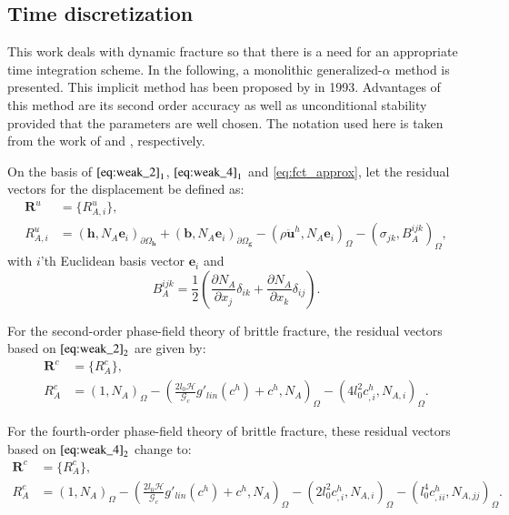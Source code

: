 \subsection{Time discretization} \label{sec:time_discr}
This work deals with dynamic fracture so that there is a need for an appropriate time integration scheme. In the following, a monolithic generalized-$\alpha$ method is presented. This implicit method has been proposed by \citet{10_PF_genAlpha} in 1993. Advantages of this method are its second order accuracy as well as unconditional stability provided that the parameters are well chosen. The notation used here is taken from the work of \citet{02_PF_HO_brittle} and \citet{01_PF_dyn_brittle}, respectively.

On the basis of $\eqref{eq:weak_2}_{1}$, $\eqref{eq:weak_4}_{1}$ and \eqref{eq:fct_approx}, let the residual vectors for the displacement be defined as:
\begin{equation} \label{eq:res_vecs_u}
	\begin{aligned}
		\mathbf{R}^{u}&=\{R_{A,i}^{u}\}, \\
		R_{A,i}^{u} &= \left(\mathbf{h},N_{A}\mathbf{e}_{i}\right)_{\partial\Omega_{\mathbf{h}}} + \left(\mathbf{b},N_{A}\mathbf{e}_{i}\right)_{\partial\Omega_{\mathbf{g}}} - \left(\rho\ddot{\mathbf{u}}^{h},N_{A}\mathbf{e}_{i}\right)_{\Omega}-\left(\sigma_{jk},B_{A}^{ijk}\right)_{\Omega},
	\end{aligned}
\end{equation}
with $i$'th Euclidean basis vector $\mathbf{e}_{i}$ and
\begin{equation}
	B_{A}^{ijk}=\frac{1}{2}\left(\frac{\partial N_{A}}{\partial x_{j}}\delta_{ik}+\frac{\partial N_{A}}{\partial x_{k}}\delta_{ij}\right).
\end{equation}

For the second-order phase-field theory of brittle fracture, the residual vectors based on $\eqref{eq:weak_2}_{2}$ are given by:
\begin{equation} \label{eq:res_vecs_c2}
	\begin{aligned}
		\mathbf{R}^{c}&=\{R_{A}^{c}\}, \\
		R_{A}^{c} &= \left(1,N_{A}\right)_{\Omega} - \left(\frac{2l_{0}\mathcal{H}}{\mathcal{G}_{c}}g'_{lin}\left(c^{h}\right) + c^{h},N_{A}\right)_{\Omega} - \left(4l_{0}^{2}c^{h}_{,i},N_{A,i}\right)_{\Omega}.
	\end{aligned}
\end{equation}

For the fourth-order phase-field theory of brittle fracture, these residual vectors based on $\eqref{eq:weak_4}_{2}$ change to:
\begin{equation} \label{eq:res_vecs_c4}
	\begin{aligned}
		\mathbf{R}^{c}&=\{R_{A}^{c}\}, \\
		R_{A}^{c} &= \left(1,N_{A}\right)_{\Omega} - \left(\frac{2l_{0}\mathcal{H}}{\mathcal{G}_{c}}g'_{lin}\left(c^{h}\right) + c^{h},N_{A}\right)_{\Omega} - \left(2l_{0}^{2}c^{h}_{,i},N_{A,i}\right)_{\Omega} - \left(l_{0}^{4}c^{h}_{,ii},N_{A,jj}\right)_{\Omega}.
	\end{aligned}
\end{equation}


